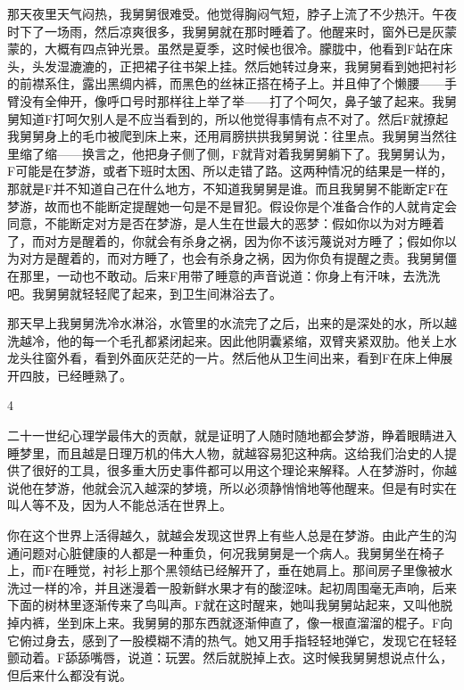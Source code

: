 那天夜里天气闷热，我舅舅很难受。他觉得胸闷气短，脖子上流了不少热汗。午夜时下了一场雨，然后凉爽很多，我舅舅就在那时睡着了。他醒来时，窗外已是灰蒙蒙的，大概有四点钟光景。虽然是夏季，这时候也很冷。朦胧中，他看到F站在床头，头发湿漉漉的，正把裙子往书架上挂。然后她转过身来，我舅舅看到她把衬衫的前襟系住，露出黑绸内裤，而黑色的丝袜正搭在椅子上。并且伸了个懒腰——手臂没有全伸开，像呼口号时那样往上举了举——打了个呵欠，鼻子皱了起来。我舅舅知道F打呵欠别人是不应当看到的，所以他觉得事情有点不对了。然后F就撩起我舅舅身上的毛巾被爬到床上来，还用肩膀拱拱我舅舅说：往里点。我舅舅当然往里缩了缩——换言之，他把身子侧了侧，F就背对着我舅舅躺下了。我舅舅认为，F可能是在梦游，或者下班时太困、所以走错了路。这两种情况的结果是一样的，那就是F并不知道自己在什么地方，不知道我舅舅是谁。而且我舅舅不能断定F在梦游，故而也不能断定提醒她一句是不是冒犯。假设你是个准备合作的人就肯定会同意，不能断定对方是否在梦游，是人生在世最大的恶梦：假如你以为对方睡着了，而对方是醒着的，你就会有杀身之祸，因为你不该污蔑说对方睡了；假如你以为对方是醒着的，而对方睡了，也会有杀身之祸，因为你负有提醒之责。我舅舅僵在那里，一动也不敢动。后来F用带了睡意的声音说道：你身上有汗味，去洗洗吧。我舅舅就轻轻爬了起来，到卫生间淋浴去了。 

那天早上我舅舅洗冷水淋浴，水管里的水流完了之后，出来的是深处的水，所以越洗越冷，他的每一个毛孔都紧闭起来。因此他阴囊紧缩，双臂夹紧双肋。他关上水龙头往窗外看，看到外面灰茫茫的一片。然后他从卫生间出来，看到F在床上伸展开四肢，已经睡熟了。 

4 

二十一世纪心理学最伟大的贡献，就是证明了人随时随地都会梦游，睁着眼睛进入睡梦里，而且越是日理万机的伟大人物，就越容易犯这种病。这给我们治史的人提供了很好的工具，很多重大历史事件都可以用这个理论来解释。人在梦游时，你越说他在梦游，他就会沉入越深的梦境，所以必须静悄悄地等他醒来。但是有时实在叫人等不及，因为人不能总活在世界上。 

你在这个世界上活得越久，就越会发现这世界上有些人总是在梦游。由此产生的沟通问题对心脏健康的人都是一种重负，何况我舅舅是一个病人。我舅舅坐在椅子上，而F在睡觉，衬衫上那个黑领结已经解开了，垂在她肩上。那间房子里像被水洗过一样的冷，并且迷漫着一股新鲜水果才有的酸涩味。起初周围毫无声响，后来下面的树林里逐渐传来了鸟叫声。F就在这时醒来，她叫我舅舅站起来，又叫他脱掉内裤，坐到床上来。我舅舅的那东西就逐渐伸直了，像一根直溜溜的棍子。F向它俯过身去，感到了一股模糊不清的热气。她又用手指轻轻地弹它，发现它在轻轻颤动着。F舔舔嘴唇，说道：玩罢。然后就脱掉上衣。这时候我舅舅想说点什么，但后来什么都没有说。 

